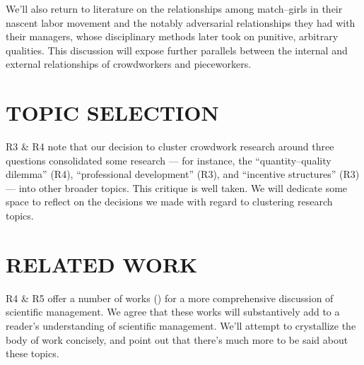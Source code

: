 \documentclass[11pt]{article}
\begin{document}

We'll also return to literature on the relationships
among match--girls in their nascent labor movement and
the notably adversarial relationships they had with their managers,
whose disciplinary methods later took on
punitive, arbitrary qualities.
This discussion will expose further parallels between
the internal and external relationships
of crowdworkers and pieceworkers.





\section*{TOPIC SELECTION}
R3 \& R4 note that our decision to cluster crowdwork research around three questions
consolidated some research
--- for instance,
the ``quantity--quality dilemma'' (R4),
``professional development'' (R3),
and ``incentive structures'' (R3) --- into other broader topics.
This critique is well taken.
We will dedicate some space to reflect on
the decisions we made with regard to clustering research topics.

\section*{RELATED WORK}
R4 \& R5 offer a number of works
(\cite[e.g.][]{williamson2016})
for a more comprehensive discussion of scientific management.
We agree that these works will
substantively add to a reader's understanding of scientific management.
We'll attempt to crystallize the body of work concisely, and
point out that there's much more to be said about these topics.
\end{document}
